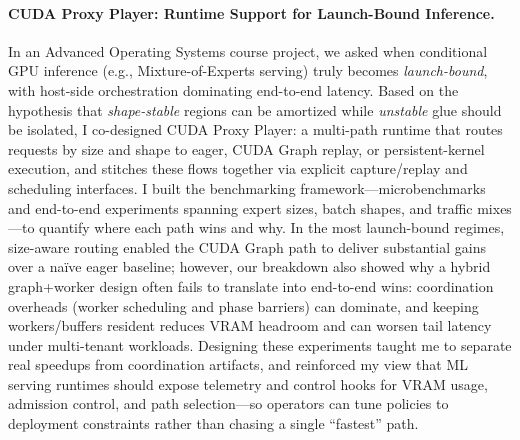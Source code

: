 \documentclass{article}
\begin{document}
\paragraph{CUDA Proxy Player: Runtime Support for Launch-Bound Inference.}
In an Advanced Operating Systems course project, we asked when conditional GPU inference (e.g., Mixture-of-Experts serving) truly becomes \emph{launch-bound}, with host-side orchestration dominating end-to-end latency. Based on the hypothesis that \emph{shape-stable} regions can be amortized while \emph{unstable} glue should be isolated, I co-designed CUDA Proxy Player: a multi-path runtime that routes requests by size and shape to eager, CUDA Graph replay, or persistent-kernel execution, and stitches these flows together via explicit capture/replay and scheduling interfaces. I built the benchmarking framework---microbenchmarks and end-to-end experiments spanning expert sizes, batch shapes, and traffic mixes---to quantify where each path wins and why. In the most launch-bound regimes, size-aware routing enabled the CUDA Graph path to deliver substantial gains over a naïve eager baseline; however, our breakdown also showed why a hybrid graph+worker design often fails to translate into end-to-end wins: coordination overheads (worker scheduling and phase barriers) can dominate, and keeping workers/buffers resident reduces VRAM headroom and can worsen tail latency under multi-tenant workloads. Designing these experiments taught me to separate real speedups from coordination artifacts, and reinforced my view that ML serving runtimes should expose telemetry and control hooks for VRAM usage, admission control, and path selection---so operators can tune policies to deployment constraints rather than chasing a single ``fastest'' path.
\end{document}
